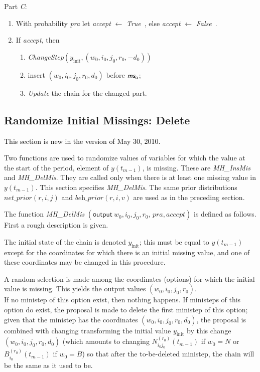 \documentclass[a4paper,12pt,fleqn]{article}
\newcommand{\nnm}[1]{\textsf{\small\textit{#1}\ }}
\newcommand{\ms}{\textsl{\textsf{\small ms}}} %
\newcommand{\addcf}[1]{{\textcolor[named]{Black}{#1}}}
\begin{document}
Part \emph{C}:
\begin{enumerate}[resume]
\item With probability \textit{pra} let \textit{accept} $\leftarrow$ \nnm{True}, else
      \textit{accept} $\leftarrow$ \nnm{False}.
\item If \textit{accept}, then
       \begin{enumerate}
       \item       \textit{ChangeStep}$( y_{\text{init}} , (w_0,i_0,j_0,r_0,-d_0))$
       \item insert $(w_0,i_0,j_0,r_0,d_0)$ before $\ms_a$;
       \item  \textit{Update} the chain for the changed part.
       \end{enumerate}
\end{enumerate}

\subsection{Randomize Initial Missings: Delete}
\label{S_RMD}
\addcf{This section is new in the version of May 30, 2010.}

Two functions are used to randomize values of variables for which the
value at the start of the period, element of $y(t_{m-1})$,
is missing. These are \textit{MH\_InsMis} and \textit{MH\_DelMis}.
They are called only when there is at least
one missing value in $y(t_{m-1})$.
This section specifies \textit{MH\_DelMis}.
The same prior distributions
$\textit{net\_prior}(r,i,j)$ and
$\textit{beh\_prior}(r,i,v) $ are used as in the preceding section.

The function
\textit{MH\_DelMis}
$( \textsf{output}\  w_0,i_0,j_0,r_0,\, \textit{pra}, \textit{accept})$
is defined as follows.
First a rough description is given.

The initial state of the chain is denoted $y_{\text{init}}$;
this must be equal to $y(t_{m-1})$ except for the coordinates
for which there is an initial missing value, and one of these
coordinates may be changed in this procedure.

A random selection is made among the coordinates (options) for which
the initial value is missing.
This yields the output values $(w_0,i_0,j_0,r_0)$.\\
If no ministep of this option exist, then nothing happens.
If ministeps of this option do exist,
the proposal is made to
delete the first ministep of this option;
given that the ministep has the coordinates  $(w_0,i_0,j_0,r_0,d_0)$,
the proposal is combined with changing
transforming the initial value
$y_{\text{init}}$
by this change $(w_0,i_0,j_0,r_0,d_0)$
(which amounts to changing  $N_{i_0j_0}^{(r_0)}(t_{m-1})$ if $w_0 = N$
or $B_{i_0}^{(r_0)}(t_{m-1})$ if $w_0 = B$)
so that after the to-be-deleted ministep,
the chain will be the same as it used to be.
\end{document}
